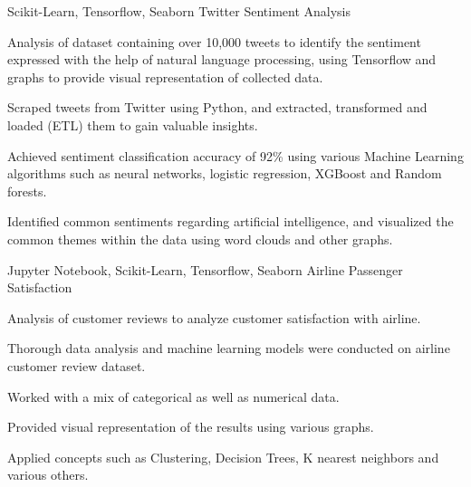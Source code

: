 \begin{cventries}
\cventry
{Scikit-Learn, Tensorflow, Seaborn} %
{Twitter Sentiment Analysis} %
{}
{}
{
	\begin{cvitems} %
	\item Analysis of dataset containing over 10,000 tweets to identify the sentiment expressed with the help of natural language processing, using Tensorflow and graphs to provide visual representation of collected data.
	\item Scraped tweets from Twitter using Python, and extracted, transformed and loaded (ETL) them to gain valuable insights.
	\item Achieved sentiment classification accuracy of 92\% using various Machine Learning algorithms such as neural networks, logistic regression, XGBoost and Random forests.
	\item Identified common sentiments regarding artificial intelligence, and visualized the common themes within the data using word clouds and other graphs.
	\end{cvitems}
}

\cventry
{Jupyter Notebook, Scikit-Learn, Tensorflow, Seaborn} %
{Airline Passenger Satisfaction} %
{}
{}
{
	\begin{cvitems} %
		\item Analysis of customer reviews to analyze customer satisfaction with airline.
		\item Thorough data analysis and machine learning models were conducted on airline customer review dataset.
		\item Worked with a mix of categorical as well as numerical data.
		\item Provided visual representation of the results using various graphs.
		\item Applied concepts such as Clustering, Decision Trees, K nearest neighbors and various others.		
	\end{cvitems}
}


\end{cventries}
